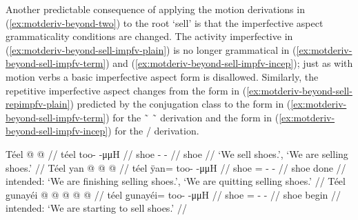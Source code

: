 \documentclass[12pt,letterpaper,oneside,article]{memoir}
\begin{document}
Another predictable consequence of applying the motion derivations in (\ref{ex:motderiv-beyond-two}) to the root  ‘sell’ is that the imperfective aspect grammaticality conditions are changed.
The activity imperfective in (\ref{ex:motderiv-beyond-sell-impfv-plain}) is no longer grammatical in (\ref{ex:motderiv-beyond-sell-impfv-term}) and (\ref{ex:motderiv-beyond-sell-impfv-incep}); just as with motion verbs a basic imperfective aspect form is disallowed.
Similarly, the repetitive imperfective aspect changes from the  form in (\ref{ex:motderiv-beyond-sell-repimpfv-plain}) predicted by the  conjugation class to the  form in (\ref{ex:motderiv-beyond-sell-impfv-term}) for the  \~\  \~\  derivation and the  form in (\ref{ex:motderiv-beyond-sell-impfv-incep}) for the / derivation.

\pex\label{ex:motderiv-beyond-sell-impfv}%
\a\label{ex:motderiv-beyond-sell-impfv-plain}%
%
\begingl
	\gla	Téel  @ {} @ {} //
	\glb	téel too-  -μμH //
	\glc	shoe -  - //
	\gld	shoe  {} {} //
	\glft	‘We sell shoes.’, ‘We are selling shoes.’
		//
\endgl
\a\label{ex:motderiv-beyond-sell-impfv-term}%
\ljudge{*}%
%
\begingl
	\gla	Téel yan @  @ {} @ {} //
	\glb	téel ÿan= too-  -μμH //
	\glc	shoe = -  - //
	\gld	shoe done\·  {} {} //
	\glft	intended: ‘We are finishing selling shoes.’, ‘We are quitting selling shoes.’
		//
\endgl
\a\label{ex:motderiv-beyond-sell-impfv-incep}%
\ljudge{*}%
%
\begingl
	\gla	Téel g̱unayéi @  @ {} @ {} @ {} @ {} //
	\glb	téel g̱unayéi= too-  -μμH //
	\glc	shoe = -  - //
	\gld	shoe begin\·  {} {} {} {} //
	\glft	intended: ‘We are starting to sell shoes.’
		//
\endgl
\xe
\end{document}
